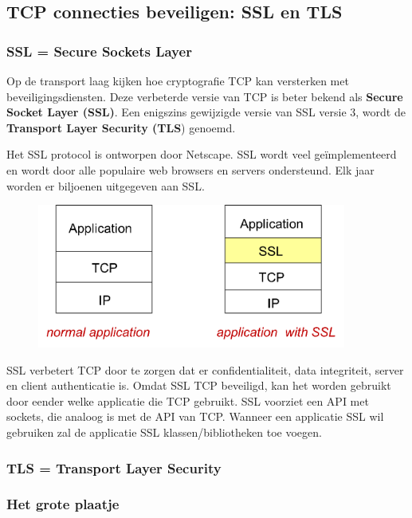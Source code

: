 \subsection{TCP connecties beveiligen: SSL en TLS}

\subsubsection{SSL = Secure Sockets Layer}

\noindent Op de transport laag kijken hoe cryptografie TCP kan versterken met beveiligingsdiensten. Deze verbeterde versie van TCP is beter bekend als \textbf{Secure Socket Layer (SSL)}. Een enigszins gewijzigde versie van SSL versie 3, wordt de \textbf{Transport Layer Security (TLS}) genoemd.

\noindent Het SSL protocol is ontworpen door Netscape. SSL wordt veel geïmplementeerd en wordt door alle populaire web browsers en servers ondersteund. Elk jaar worden er biljoenen uitgegeven aan SSL.

\begin{figure}[h]
    \centering
    \includegraphics[width=4in]{./img/imghfdst8/hfdst8puntje27.png}
    \caption{ }      
    \label{fig: }
\end{figure}

\noindent SSL verbetert TCP door te zorgen dat er confidentialiteit, data integriteit, server en client authenticatie is. Omdat SSL TCP beveiligd, kan het worden gebruikt door eender welke applicatie die TCP gebruikt. SSL voorziet een API met sockets, die analoog is met de API van TCP. Wanneer een applicatie SSL wil gebruiken zal de applicatie SSL klassen/bibliotheken toe voegen.

\subsubsection{TLS = Transport Layer Security}

\clearpage

\subsubsection{Het grote plaatje}

